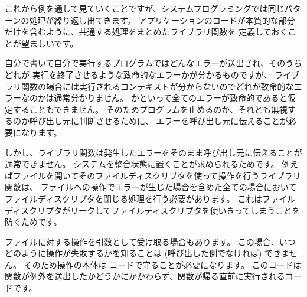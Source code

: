 これから例を通して見ていくことですが、システムプログラミングでは同じパターンの処理が繰り返し出てきます。
アプリケーションのコードが本質的な部分だけを含むように、共通する処理をまとめたライブラリ関数を
定義しておくことが望ましいです。

自分で書いて自分で実行するプログラムではどんなエラーが送出され、そのうちどれが
実行を終了させるような致命的なエラーかが分かるものですが、
ライブラリ関数の場合には実行されるコンテキストが分からないのでどれが致命的なエラーなのかは通常分かりません。
かといって全てのエラーが致命的であると仮定することもできません。
そのためプログラムを止めるのか、それとも無視するのか呼び出し元に判断させるために、
エラーを呼び出し元に伝えることが必要になります。

しかし、ライブラリ関数は発生したエラーをそのまま呼び出し元に伝えることが通常できません。
システムを整合状態に置くことが求められるためです。
例えばファイルを開いてそのファイルディスクリプタを使って操作を行うライブラリ関数は、
ファイルへの操作でエラーが生じた場合を含めた全ての場合においてファイルディスクリプタを閉じる処理を行う必要があります。
これはファイルディスクリプタがリークしてファイルディスクリプタを使いきってしまうことを防ぐためです。

ファイルに対する操作を引数として受け取る場合もあります。
この場合、いつどのように操作が失敗するかを知ることは (呼び出した側でなければ) できません。
そのため操作の本体は  コードで守ることが必要になります。
このコードは関数が例外を送出したかどうかにかかわらず、関数が帰る直前に実行されるコードです。

